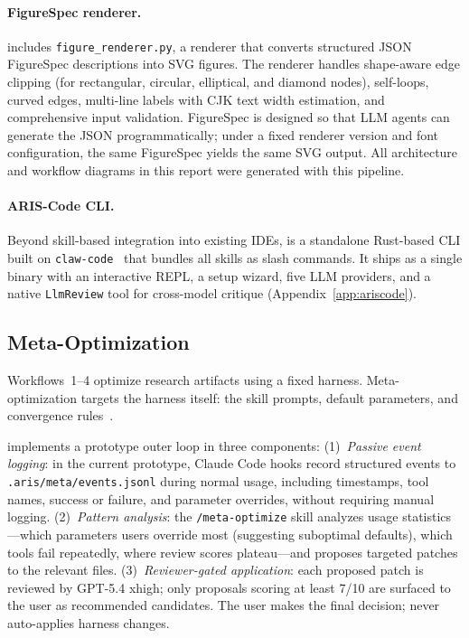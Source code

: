 \paragraph{FigureSpec renderer.}
\aris{} includes \texttt{figure\_renderer.py}, a renderer that converts structured JSON FigureSpec descriptions into SVG figures.
The renderer handles shape-aware edge clipping (for rectangular, circular, elliptical, and diamond nodes), self-loops, curved edges, multi-line labels with CJK text width estimation, and comprehensive input validation.
FigureSpec is designed so that LLM agents can generate the JSON programmatically; under a fixed renderer version and font configuration, the same FigureSpec yields the same SVG output.
All architecture and workflow diagrams in this report were generated with this pipeline.

\paragraph{ARIS-Code CLI.}
Beyond skill-based integration into existing IDEs, \ariscode{} is a standalone Rust-based CLI built on \texttt{claw-code}~\citep{ultraworkers2025} that bundles all skills as slash commands.
It ships as a single binary with an interactive REPL, a setup wizard, five LLM providers, and a native \texttt{LlmReview} tool for cross-model critique (Appendix~\ref{app:ariscode}).

\subsection{Meta-Optimization}
\label{sec:metaopt}

Workflows~1--4 optimize research artifacts using a fixed harness.
Meta-optimization targets the harness itself: the skill prompts, default parameters, and convergence rules~\citep{lee2026metaharness}.

\aris{} implements a prototype outer loop in three components:
(1)~\emph{Passive event logging}: in the current prototype, Claude Code hooks record structured events to \texttt{.aris/meta/events.jsonl} during normal usage, including timestamps, tool names, success or failure, and parameter overrides, without requiring manual logging.
(2)~\emph{Pattern analysis}: the \texttt{/meta-optimize} skill analyzes usage statistics---which parameters users override most (suggesting suboptimal defaults), which tools fail repeatedly, where review scores plateau---and proposes targeted patches to the relevant \skillmd{} files.
(3)~\emph{Reviewer-gated application}: each proposed patch is reviewed by GPT-5.4 xhigh; only proposals scoring at least 7/10 are surfaced to the user as recommended candidates. The user makes the final decision; \aris{} never auto-applies harness changes.
